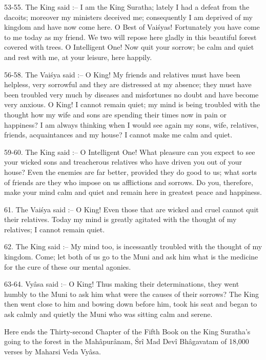 53-55. The King said :-- I am the King Suratha; lately I had a defeat from the dacoits; moreover my ministers deceived me; consequently I am deprived of my kingdom and have now come here. O Best of Vai\'syas! Fortunately you have come to me today as my friend. We two will repose here gladly in this beautiful forest covered with trees. O Intelligent One! Now quit your sorrow; be calm and quiet and rest with me, at your leisure, here happily.

56-58. The Vai\'sya said :-- O King! My friends and relatives must have been helpless, very sorrowful and they are distressed at my absence; they must have been troubled very much by diseases and misfortunes no doubt and have become very anxious. O King! I cannot remain quiet; my mind is being troubled with the thought how my wife and sons are spending their times now in pain or happiness? I am always thinking when I would see again my sons, wife, relatives, friends, acquaintances and my house? I cannot make me calm and quiet.

59-60. The King said :-- O Intelligent One! What pleasure can you expect to see your wicked sons and treacherous relatives who have driven you out of your house? Even the enemies are far better, provided they do good to us; what sorts of friends are they who impose on us afflictions and sorrows. Do you, therefore, make your mind calm and quiet and remain here in greatest peace and happiness.

61. The Vai\'sya said :-- O King! Even those that are wicked and cruel cannot quit their relatives. Today my mind is greatly agitated with the thought of my relatives; I cannot remain quiet.

62. The King said :-- My mind too, is incessantly troubled with the thought of my kingdom. Come; let both of us go to the Muni and ask him what is the medicine for the cure of these our mental agonies.

63-64. Vy\^asa said :-- O King! Thus making their determinations, they went humbly to the Muni to ask him what were the causes of their sorrows? The King then went close to him and bowing down before him, took his seat and began to ask calmly and quietly the Muni who was sitting calm and serene.

Here ends the Thirty-second Chapter of the Fifth Book on the King Suratha's going to the forest in the Mah\^apur\^anam, \'Sr\^i Mad Dev\^i Bh\^agavatam of 18,000 verses by Maharsi Veda Vy\^asa.